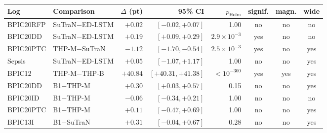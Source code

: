 \begin{tabular}{llrrrccc}
\toprule
Log & Comparison & $\Delta$ (pt) & 95\% CI & $p_{\mathrm{Holm}}$ & signif. & magn. & wide \\
\midrule
BPIC20RFP & SuTraN$-$ED-LSTM & $+0.02$ & $[-0.02,+0.07]$ & 1.00 & no & no & no \\
BPIC20DD & SuTraN$-$ED-LSTM & $+0.19$ & $[+0.09,+0.29]$ & $2.9\times10^{-3}$ & yes & no & no \\
BPIC20PTC & THP-M$-$SuTraN & $-1.12$ & $[-1.70,-0.54]$ & $2.5\times10^{-3}$ & yes & no & yes \\
Sepsis & SuTraN$-$ED-LSTM & $+0.05$ & $[-1.07,+1.17]$ & 1.00 & no & no & yes \\
BPIC12 & THP-M$-$THP-B & $+40.84$ & $[+40.31,+41.38]$ & $<10^{-300}$ & yes & yes & yes \\
BPIC20DD & B1$-$THP-M & $+0.30$ & $[+0.03,+0.57]$ & 0.15 & no & no & yes \\
BPIC20ID & B1$-$THP-M & $-0.06$ & $[-0.34,+0.21]$ & 1.00 & no & no & no \\
BPIC20PTC & B1$-$THP-M & $+0.11$ & $[-0.47,+0.69]$ & 1.00 & no & no & yes \\
BPIC13I & B1$-$SuTraN & $+0.31$ & $[-0.04,+0.67]$ & 0.28 & no & no & yes \\
\bottomrule
\end{tabular}
